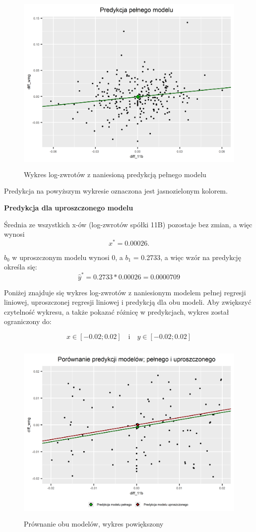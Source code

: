 \documentclass[a4paper,11pt]{article}
\begin{document}
\begin{figure}[h]
\centering
\includegraphics[width=12cm, height=9cm]{img/reg_pred_pelny.png}
\caption{Wykres log-zwrotów z naniesioną predykcją pełnego modelu}
\end{figure}

Predykcja na powyższym wykresie oznaczona jest jasnozielonym kolorem.
\vspace*{0.4cm}

\textbf{Predykcja dla uproszczonego modelu}

Średnia ze wszystkich x-ów (log-zwrotów spółki 11B) pozostaje bez zmian, a więc wynosi
\[x^* = 0.00026.\]


\(b_0\) w uproszczonym modelu wynosi 0, a \(b_1\) = 0.2733, a więc wzór na predykcję określa się:
\[\hat{y}^* = 0.2733*0.00026 = 0.0000709\]

\newpage
Poniżej znajduje się wykres log-zwrotów z naniesionym modelem pełnej regresji liniowej, uproszczonej regresji liniowej i predykcją dla obu modeli. Aby zwiększyć czytelność wykresu, a także pokazać różnicę w predykcjach, wykres został ograniczony do:

\[x \in [-0.02; 0.02] \quad \text{i} \quad y \in [-0.02; 0.02]
\]

\begin{figure}[h]
\centering
\includegraphics[width=12cm, height=9cm]{img/reg_pred_calosc.png}
\caption{Prównanie obu modelów, wykres powiększony}
\end{figure}
\end{document}
